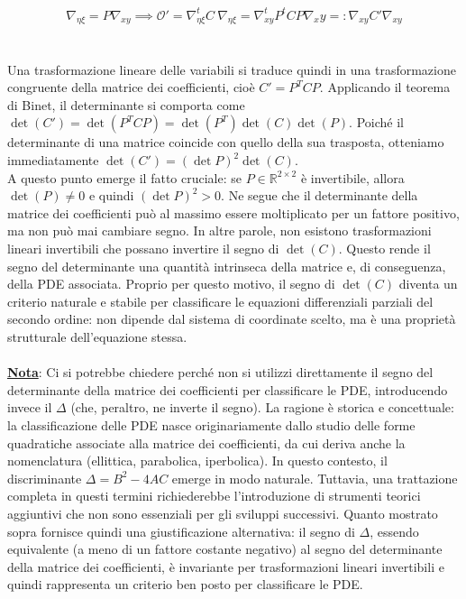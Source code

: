 \documentclass[a4paper,12pt]{report}
\begin{document}
\\
\\ \[ \nabla_{\eta\xi}=P\nabla_{xy}\implies \mathcal{O}'=\nabla_{\eta\xi}^tC\ \nabla_{\eta\xi}=\nabla_{xy}^tP^tCP\nabla_xy=:\nabla_{xy}C'\nabla_{xy} \]
\\
\\ Una trasformazione lineare delle variabili si traduce quindi in una trasformazione congruente della matrice dei coefficienti, cioè $C' = P^T C P$. Applicando il teorema di Binet, il determinante si comporta come $\det(C') = \det(P^T C P) = \det(P^T)\det(C)\det(P)$. Poiché il determinante di una matrice coincide con quello della sua trasposta, otteniamo immediatamente
$\det(C') = (\det P)^2 \det(C)$. 
\\A questo punto emerge il fatto cruciale: se $P \in \mathbb{R}^{2\times 2}$ è invertibile, allora $\det(P) \neq 0$ e quindi $(\det P)^2 > 0$. Ne segue che il determinante della matrice dei coefficienti può al massimo essere moltiplicato per un fattore positivo, ma non può mai cambiare segno.  In altre parole, non esistono trasformazioni lineari invertibili che possano invertire il segno di $\det(C)$. Questo rende il segno del determinante una quantità intrinseca della matrice e, di conseguenza, della PDE associata. Proprio per questo motivo, il segno di $\det(C)$ diventa un criterio naturale e stabile per classificare le equazioni differenziali parziali del secondo ordine: non dipende dal sistema di coordinate scelto, ma è una proprietà strutturale dell’equazione stessa.
\\
\\ \underline{\textbf{Nota}}: Ci si potrebbe chiedere perché non si utilizzi direttamente il segno del determinante della matrice dei coefficienti per classificare le PDE, introducendo invece il $\Delta$ (che, peraltro, ne inverte il segno).  La ragione è storica e concettuale: la classificazione delle PDE nasce originariamente dallo studio delle forme quadratiche associate alla matrice dei coefficienti, da cui deriva anche la nomenclatura (ellittica, parabolica, iperbolica). In questo contesto, il discriminante $\Delta = B^2 - 4AC$ emerge in modo naturale. Tuttavia, una trattazione completa in questi termini richiederebbe l’introduzione di strumenti teorici aggiuntivi che non sono essenziali per gli sviluppi successivi. Quanto mostrato sopra fornisce quindi una giustificazione alternativa: il segno di $\Delta$, essendo equivalente (a meno di un fattore costante negativo) al segno del determinante della matrice dei coefficienti, è invariante per trasformazioni lineari invertibili e quindi rappresenta un criterio ben posto per classificare le PDE.
\end{document}
